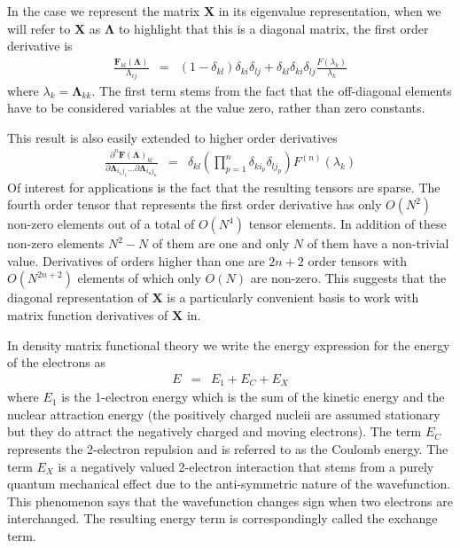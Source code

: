 \documentclass{article}
\begin{document}
In the case we represent the matrix $\mathbf{X}$ in its eigenvalue
representation, when we will refer to $\mathbf{X}$ as $\mathbf{\Lambda}$ to
highlight that this is a diagonal matrix, the first order derivative is
\begin{eqnarray}
   \frac{\mathbf{F}_{kl}(\mathbf{\Lambda})}{\mathrm{\Lambda}_{ij}}
   &=& (1-\delta_{kl})\delta_{ki}\delta_{lj}
    +  \delta_{kl}\delta_{ki}\delta_{lj}\frac{F(\lambda_{k})}{\lambda_{k}}
\end{eqnarray}
where $\lambda_k = \mathbf{\Lambda}_{kk}$. The first term stems from the fact
that the off-diagonal elements have to be considered variables at the value
zero, rather than zero constants.

This result is also easily extended to higher order derivatives 
\begin{eqnarray}
  \frac{\partial^n \mathbf{F}(\mathbf{\Lambda})_{kl}}
       {\partial\mathbf{\Lambda}_{i_1j_1}\ldots
        \partial\mathbf{\Lambda}_{i_nj_n}}
  &=& \delta_{kl}(\prod_{p=1}^{n}\delta_{ki_p}\delta_{lj_p})
      F^{(n)}(\lambda_{k})
\end{eqnarray}
Of interest for applications is the fact that the resulting tensors are 
sparse. The fourth order tensor that represents the first order derivative
has only $O(N^2)$ non-zero elements out of a total of $O(N^4)$ tensor elements.
In addition of these non-zero elements $N^2-N$ of them are one and only $N$ of
them have a non-trivial value.
Derivatives of orders higher than one are $2n+2$ order tensors with
$O(N^{2n+2})$ elements of which only $O(N)$ are non-zero. This suggests that
the diagonal representation of $\mathbf{X}$ is a particularly convenient basis
to work with matrix function derivatives of $\mathbf{X}$ in.

In density matrix functional theory we write the energy expression for the
energy of the electrons as
\begin{eqnarray}
   E &=& E_1 + E_C + E_X
\end{eqnarray}
where \(E_1\) is the 1-electron energy which is the sum of the kinetic energy
and the nuclear attraction energy (the positively charged nucleii are assumed
stationary but they do attract the negatively charged and moving electrons).
The term \(E_C\) represents the 2-electron repulsion and is referred to as
the Coulomb energy. The term \(E_X\) is a negatively valued 2-electron 
interaction that stems from a purely quantum mechanical effect due to the
anti-symmetric nature of the wavefunction. This phenomenon says that the 
wavefunction changes sign when two electrons are interchanged. The resulting
energy term is correspondingly called the exchange term. 
\end{document}
